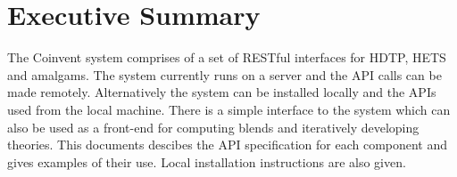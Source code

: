 \section*{Executive Summary}
\thispagestyle{empty}
\addtolength{\parskip}{\baselineskip}

The Coinvent system comprises of a set of RESTful interfaces for HDTP, HETS and amalgams. The system currently runs on a server and the API calls can be made remotely. Alternatively the system can be installed locally and the APIs used from the local machine. There is a simple interface to the system which can also be used as a front-end for computing blends and iteratively developing theories. This documents descibes the API specification for each component and gives examples of their use. Local installation instructions are also given.